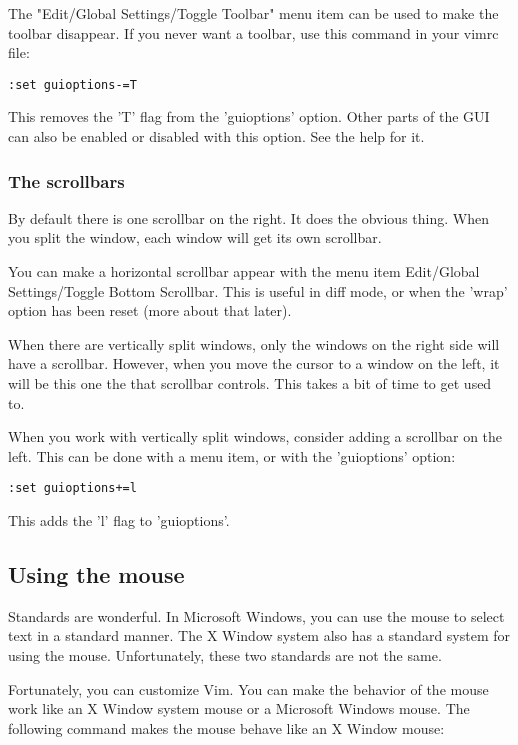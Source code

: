 The "Edit/Global Settings/Toggle Toolbar" menu item can be used to make the toolbar disappear.
If you never want a toolbar, use this command in your vimrc file:

 \begin{Verbatim}[samepage=true]
 :set guioptions-=T
 \end{Verbatim}

This removes the 'T' flag from the 'guioptions' option.
Other parts of the GUI can also be enabled or disabled with this option.
See the help for it.

\subsubsection{The scrollbars}
By default there is one scrollbar on the right.
It does the obvious thing.
When you split the window, each window will get its own scrollbar.

You can make a horizontal scrollbar appear with the menu item Edit/Global Settings/Toggle Bottom Scrollbar.
This is useful in diff mode, or when the 'wrap' option has been reset (more about that later).

When there are vertically split windows, only the windows on the right side will have a scrollbar.
However, when you move the cursor to a window on the left, it will be this one the that scrollbar controls.
This takes a bit of time to get used to.

When you work with vertically split windows, consider adding a scrollbar on the left.
This can be done with a menu item, or with the 'guioptions' option:

 \begin{Verbatim}[samepage=true]
 :set guioptions+=l
 \end{Verbatim}

This adds the 'l' flag to 'guioptions'.
\subsection{Using the mouse}
Standards are wonderful.
In Microsoft Windows, you can use the mouse to select text in a standard manner.
The X Window system also has a standard system for using the mouse.
Unfortunately, these two standards are not the same.

Fortunately, you can customize Vim.
You can make the behavior of the mouse work like an X Window system mouse or a Microsoft Windows mouse.
The following command makes the mouse behave like an X Window mouse:

